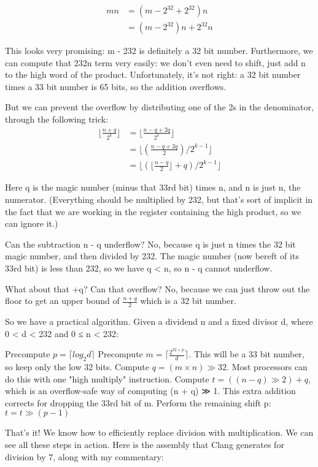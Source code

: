 $$\begin{align} m n & = (m - 2^{32} + 2^{32})n \\ & = (m - 2^{32})n + 2^{32} n \end{align}$$

This looks very promising: m - 232 is definitely a 32 bit number. Furthermore, we can compute that 232n term very easily: we don't even need to shift, just add n to the high word of the product. Unfortunately, it's not right: a 32 bit number times a 33 bit number is 65 bits, so the addition overflows.

But we can prevent the overflow by distributing one of the 2s in the denominator, through the following trick: $$ \begin{align} \lfloor \frac {n + q} {2^k} \rfloor & = \lfloor \frac {n - q + 2q} {2^k} \rfloor \\ & = \lfloor ( \frac {n - q + 2q} 2 ) / {2^{k-1}} \rfloor \\ & = \lfloor ( \lfloor \frac {n - q} 2 \rfloor + q ) / {2^{k-1}} \rfloor \end{align} $$

Here q is the magic number (minus that 33rd bit) times n, and n is just n, the numerator. (Everything should be multiplied by 232, but that's sort of implicit in the fact that we are working in the register containing the high product, so we can ignore it.)

Can the subtraction n - q underflow? No, because q is just n times the 32 bit magic number, and then divided by 232. The magic number (now bereft of its 33rd bit) is less than 232, so we have q < n, so n - q cannot underflow.

What about that +q? Can that overflow? No, because we can just throw out the floor to get an upper bound of $\frac {n + q} 2$ which is a 32 bit number.

So we have a practical algorithm. Given a dividend n and a fixed divisor d, where 0 < d < 232 and 0 ≤ n < 232:

    Precompute $p = \lceil log_2 d \rceil$
    Precompute $m = \lceil \frac {2^{32 + p}} d \rceil$. This will be a 33 bit number, so keep only the low 32 bits.
    Compute $q = (m \times n) \gg 32$. Most processors can do this with one "high multiply" instruction.
    Compute $t = ((n - q) \gg 2) + q$, which is an overflow-safe way of computing (n + q) ≫ 1. This extra addition corrects for dropping the 33rd bit of m.
    Perform the remaining shift p: $t = t ≫ (p-1)$

That's it! We know how to efficiently replace division with multiplication. We can see all these steps in action. Here is the assembly that Clang generates for division by 7, along with my commentary:

